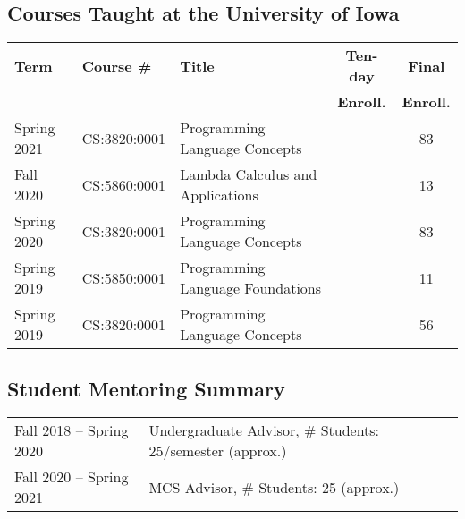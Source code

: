 \documentclass[10pt]{article}
\renewcommand{\iowa}[1]{#1}
\renewcommand{\iowa}[1]{}
\begin{document}
\iowa{
\section*{\teaching}
}
\begin{IOWA ONLY}

\subsection*{Courses Taught at the University of Iowa}
\smallskip

\begin{tabular}{| l | l | p{15em} | c | c |}
 \hline
 {\bf Term} & {\bf Course \#} & {\bf Title} & {\bf Ten-day}    & {\bf Final} \\ 
            &                 &             & {\bf Enroll.} & {\bf Enroll.} \\ 
 \hline
 \hline
 Spring 2021
 & CS:3820:0001 & Programming Language Concepts
 & \  & 83
 \\
 \hline
 Fall 2020
 & CS:5860:0001 & Lambda Calculus and Applications
 & \  & 13
 \\
 \hline
 Spring 2020
 & CS:3820:0001 & Programming Language Concepts
 & \  & 83
 \\
 \hline
 Spring 2019
 & CS:5850:0001  & Programming Language Foundations
 & \  & 11
 \\
 \hline
 Spring 2019
 & CS:3820:0001 & Programming Language Concepts
 & \  & 56
 \\
 \hline
\end{tabular}
\smallskip


\subsection*{Student Mentoring Summary}
\smallskip

\begin{tabular}{l@{\quad\ }p{35em}} 
 Fall 2018 -- Spring 2020
 & Undergraduate Advisor, \# Students: 25/semester (approx.)
 \\[.5ex]
 Fall 2020 -- Spring 2021
 & MCS Advisor, \# Students: 25 (approx.)
 \\[.5ex]
\end{tabular}


\end{IOWA ONLY}
\end{document}

